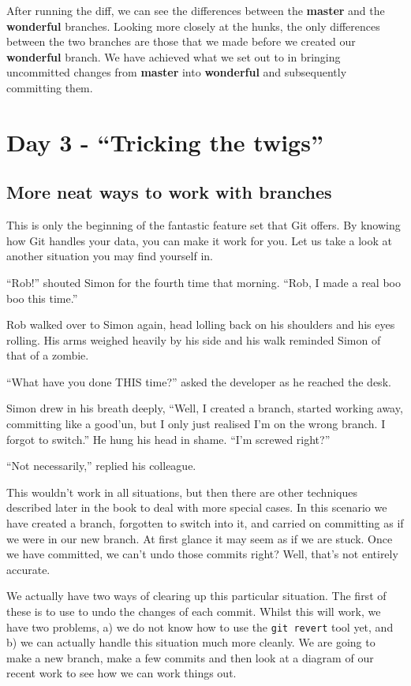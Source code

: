 After running the diff, we can see the differences between the \textbf{master} and the \textbf{wonderful} branches.
Looking more closely at the hunks, the only differences between the two branches are those that we made before we created our \textbf{wonderful} branch.
We have achieved what we set out to in bringing uncommitted changes from \textbf{master} into \textbf{wonderful} and subsequently committing them.

\section{Day 3 - ``Tricking the twigs''}
\subsection{More neat ways to work with branches}

This is only the beginning of the fantastic feature set that Git offers.
By knowing how Git handles your data, you can make it work for you.
Let us take a look at another situation you may find yourself in.

\begin{trenches}
``Rob!'' shouted Simon for the fourth time that morning.
``Rob, I made a real boo boo this time.''

Rob walked over to Simon again, head lolling back on his shoulders and his eyes rolling.
His arms weighed heavily by his side and his walk reminded Simon of that of a zombie.

``What have you done THIS time?'' asked the developer as he reached the desk.

Simon drew in his breath deeply, ``Well, I created a branch, started working away, committing like a good'un, but I only just realised I'm on the wrong branch.
I forgot to switch.''  He hung his head in shame.
``I'm screwed right?''

``Not necessarily,'' replied his colleague.
\end{trenches}

This wouldn't work in all situations, but then there are other techniques described later in the book to deal with more special cases.
In this scenario we have created a branch, forgotten to switch into it, and carried on committing as if we were in our new branch.
At first glance it may seem as if we are stuck.
Once we have committed, we can't undo those commits right?  Well, that's not entirely accurate.

We actually have two ways of clearing up this particular situation.
The first of these is to use  to undo the changes of each commit.
Whilst this will work, we have two problems, a) we do not know how to use the \texttt{git revert} tool yet, and b) we can actually handle this situation much more cleanly.
We are going to make a new branch, make a few commits and then look at a diagram of our recent work to see how we can work things out.

